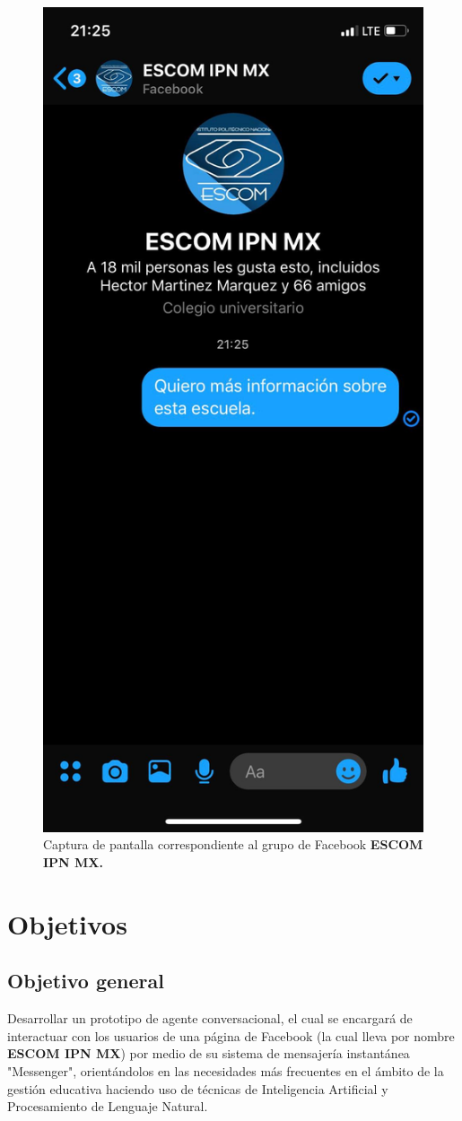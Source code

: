 \begin{figure}[H]
\begin{minipage}{0.5\textwidth}
         \includegraphics[width=.7\linewidth]{Latex/Classes/Imagenes/ss-escom.jpg}
         \caption{Captura de pantalla correspondiente al grupo de Facebook \bf{ESCOM IPN MX}.}
       \end{minipage}
    \end{figure}
    
\section{Objetivos}
    
    \subsection{Objetivo general}
        Desarrollar un prototipo de agente conversacional, el cual se encargará de interactuar con los usuarios de una página de Facebook (la cual lleva por nombre {\bf ESCOM IPN MX}) por medio de su sistema de mensajería instantánea "Messenger", orientándolos en las necesidades más frecuentes en el ámbito de la gestión educativa haciendo uso de técnicas de Inteligencia Artificial y Procesamiento de Lenguaje Natural.


